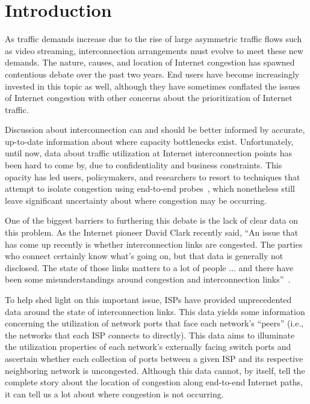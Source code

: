 \section{Introduction}\label{sec:intro}

As traffic demands increase due to the rise of
large asymmetric traffic flows such as
 video
streaming,
interconnection arrangements must evolve to meet these new demands. The nature, causes,
and location of Internet congestion has spawned contentious debate over
the past two years. End users have become increasingly invested in this
topic as well, although they have sometimes conflated the issues of Internet
congestion with other concerns about the prioritization of Internet
traffic.

Discussion about interconnection can and should be better informed by
accurate, up-to-date information about where capacity bottlenecks
exist. Unfortunately, until now, 
data about traffic utilization at Internet interconnection points has
been hard to come by, due to confidentiality and business
constraints. This opacity has led users, policymakers, and researchers
to resort to techniques that attempt to isolate congestion using
end-to-end probes~\cite{coates2001network,www-ndt,www-mlab}, which
nonetheless still leave significant uncertainty 
about where congestion may be occurring.  

One of the biggest barriers to furthering this debate is the lack of
clear data on this problem. As the Internet pioneer David Clark recently
said, ``An issue that has come up recently is whether interconnection
links are congested. The parties who connect certainly know what's going
on, but that data is generally not disclosed. The state of those links
matters to a lot of people ... and there have been some
misunderstandings around congestion and interconnection
links''~\cite{clark:nanog66}.   

To help shed light on this important issue, ISPs have provided
unprecedented data around the state of interconnection links. This data
yields some information concerning the utilization of network ports that
face each network's ``peers'' (i.e., the networks that each ISP connects
to directly). This data aims to illuminate the utilization properties of
each network’s externally facing switch ports and ascertain whether each
collection of ports between a given ISP and its respective neighboring
network is uncongested. Although this data cannot, by itself, tell the
complete story about the location of congestion along end-to-end
Internet paths, it can tell us a lot about where congestion is not
occurring.  

